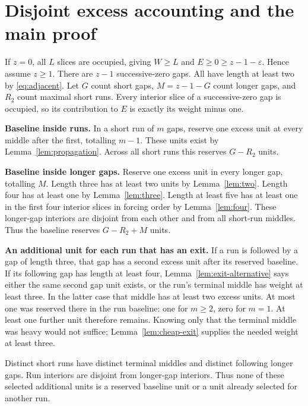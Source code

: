 \documentclass{article}
\begin{document}
\section{Disjoint excess accounting and the main proof}\label{sec:accounting}

If \(z = 0\), all \(L\) slices are occupied, giving \(W \ge L\) and
\(E \ge 0 \ge z - 1 - \varepsilon\). Hence assume \(z \ge 1\). There are \(z - 1\)
successive-zero gaps. All have length at least two by \eqref{eq:adjacent}. Let \(G\) count short
gaps, \(M = z - 1 - G\) count longer gaps, and \(R_2\) count maximal short runs. Every interior
slice of a successive-zero gap is occupied, so its contribution to \(E\) is exactly its weight
minus one.

\textbf{Baseline inside runs.} In a short run of \(m\) gaps, reserve one excess unit at every
middle after the first, totalling \(m - 1\). These units exist by Lemma~\ref{lem:propagation}.
Across all short runs this reserves \(G - R_2\) units.

\textbf{Baseline inside longer gaps.} Reserve one excess unit in every longer gap, totalling
\(M\). Length three has at least two units by Lemma~\ref{lem:two}. Length four has at least one
by Lemma~\ref{lem:three}. Length at least five has at least one in the first four interior slices
in forcing order by Lemma~\ref{lem:four}. These longer-gap interiors are disjoint from each other
and from all short-run middles. Thus the baseline reserves \(G - R_2 + M\) units.

\textbf{An additional unit for each run that has an exit.} If a run is followed by a gap of length
three, that gap has a second excess unit after its reserved baseline. If its following gap has
length at least four, Lemma~\ref{lem:exit-alternative} says either the same second gap unit
exists, or the run's terminal middle has weight at least three. In the latter case that middle
has at least two excess units. At most one was reserved there in the run baseline: one for
\(m \ge 2\), zero for \(m = 1\). At least one further unit therefore remains. Knowing only that
the terminal middle was heavy would not suffice; Lemma~\ref{lem:cheap-exit} supplies the needed
weight at least three.

Distinct short runs have distinct terminal middles and distinct following longer gaps. Run
interiors are disjoint from longer-gap interiors. Thus none of these selected additional units is
a reserved baseline unit or a unit already selected for another run.
\end{document}
